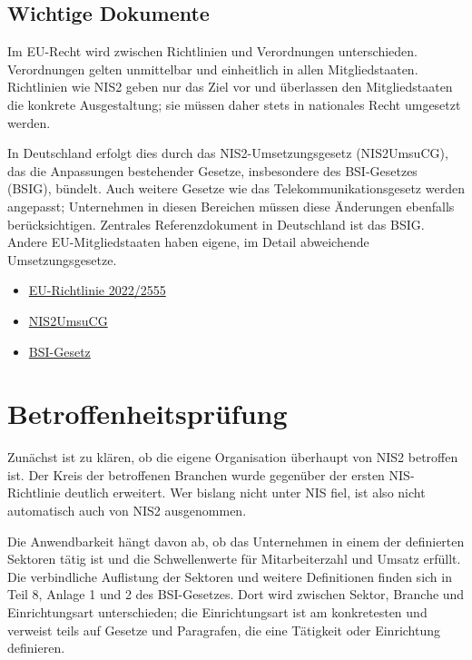 \subsection{Wichtige Dokumente}
Im EU-Recht wird zwischen Richtlinien und Verordnungen unterschieden. Verordnungen gelten unmittelbar und einheitlich in allen Mitgliedstaaten. Richtlinien wie NIS2 geben nur das Ziel vor und überlassen den Mitgliedstaaten die konkrete Ausgestaltung; sie müssen daher stets in nationales Recht umgesetzt werden.

In Deutschland erfolgt dies durch das NIS2-Umsetzungsgesetz (NIS2UmsuCG), das die Anpassungen bestehender Gesetze, insbesondere des BSI-Gesetzes (BSIG), bündelt. Auch weitere Gesetze wie das Telekommunikationsgesetz werden angepasst; Unternehmen in diesen Bereichen müssen diese Änderungen ebenfalls berücksichtigen. Zentrales Referenzdokument in Deutschland ist das BSIG. Andere EU-Mitgliedstaaten haben eigene, im Detail abweichende Umsetzungsgesetze.

\begin{itemize}
    \item \href{https://eur-lex.europa.eu/legal-content/DE/TXT/PDF/?uri=CELEX:32022L2555/}{EU-Richtlinie 2022/2555}
    \item \href{https://www.bmi.bund.de/SharedDocs/gesetzgebungsverfahren/DE/Downloads/kabinettsfassung/CI1/nis2-regierungsentwurf.pdf?__blob=publicationFile&v=2}{NIS2UmsuCG}
    \item \href{https://www.gesetze-im-internet.de/bsig_2025/BJNR12D0B0025.html}{BSI-Gesetz}
\end{itemize}



\newpage

\section{Betroffenheitsprüfung}

Zunächst ist zu klären, ob die eigene Organisation überhaupt von NIS2 betroffen ist. Der Kreis der betroffenen Branchen wurde gegenüber der ersten NIS-Richtlinie deutlich erweitert. Wer bislang nicht unter NIS fiel, ist also nicht automatisch auch von NIS2 ausgenommen.

Die Anwendbarkeit hängt davon ab, ob das Unternehmen in einem der definierten Sektoren tätig ist und die Schwellenwerte für Mitarbeiterzahl und Umsatz erfüllt. Die verbindliche Auflistung der Sektoren und weitere Definitionen finden sich in Teil 8, Anlage 1 und 2 des BSI-Gesetzes. Dort wird zwischen Sektor, Branche und Einrichtungsart unterschieden; die Einrichtungsart ist am konkretesten und verweist teils auf Gesetze und Paragrafen, die eine Tätigkeit oder Einrichtung definieren.

